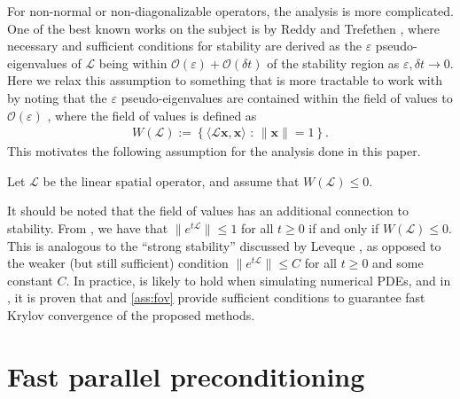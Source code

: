 \documentclass[review]{siamart}
\begin{document}
For non-normal or non-diagonalizable operators, the analysis is more complicated.
One of the best known works on the subject is by Reddy and Trefethen \cite{reddy92},
where necessary and sufficient conditions for stability are derived as the
$\varepsilon$ pseudo-eigenvalues of $\mathcal{L}$ being within
$\mathcal{O}(\varepsilon) + \mathcal{O}(\delta t)$ of the stability region
as $\varepsilon,\delta t\to 0$. Here we relax this assumption to something
that is more tractable to work with by noting that the $\varepsilon$
pseudo-eigenvalues are contained within the field of values to
$\mathcal{O}(\varepsilon)$ \cite[Eq. (17.9)]{trefethen2005spectra},
where the field of values is defined as
%
\begin{align}\label{eq:fov}
W(\mathcal{L}) := \left\{ \langle \mathcal{L}\mathbf{x},\mathbf{x}\rangle \text{ : }
	\|\mathbf{x}\| = 1 \right\}.
\end{align}
%
This motivates the following assumption for the analysis done in this paper.
%
\begin{assumption}\label{ass:fov}
Let $\mathcal{L}$ be the linear spatial operator, and assume that $W(\mathcal{L}) \leq 0$.
\end{assumption}
%
It should be noted that the field of values has an additional connection
to stability. From \cite[Theorem 17.1]{trefethen2005spectra}, we have that
$\|e^{t\mathcal{L}}\|\leq 1$ for all $t\geq 0$ if and only if $W(\mathcal{L}) \leq 0$.
This is analogous to the ``strong stability'' discussed by Leveque
\cite[Chapter 9.5]{leveque2007finite}, as opposed to the weaker (but still
sufficient) condition $\|e^{t\mathcal{L}}\|\leq C$ for all $t\geq 0$ and
some constant $C$. In practice,  is likely to hold when
simulating numerical PDEs, and in , it is proven that
 and \ref{ass:fov} provide sufficient conditions to guarantee
fast Krylov convergence of the proposed methods.

\section{Fast parallel preconditioning}\label{sec:solve}
\end{document}
